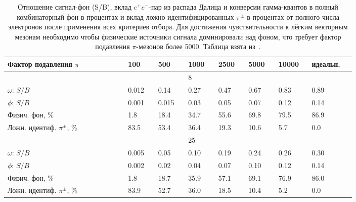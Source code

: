 \begin{table}[H]
\caption{Отношение сигнал-фон (S/B), вклад $e^{+}e^{-}$-пар из распада Далица и конверсии гамма-квантов в полный комбинаторный фон в процентах и вклад ложно идентифицированных $\pi^{\pm}$ в процентах от полного числа электронов после применения всех критериев отбора. Для достижения чувствительности к лёгким векторным мезонам необходимо чтобы физические источники сигнала доминировали над фоном, что требует фактор подавления $\pi$-мезонов более 5000. Таблица взята из~\cite{TDR_RICH}.}
\label{tabl:RICHchar}



\begin{tabular}{ | p{0.28\linewidth} p{0.07\linewidth} p{0.07\linewidth} p{0.07\linewidth} p{0.07\linewidth} p{0.07\linewidth} p{0.07\linewidth} p{0.1\linewidth} | }

\hline
Фактор подавления $\pi$ & 100 & 500 & 1000 & 2500 & 5000 & 10000 & идеальн. \\
\hline
\hline

& & & 8~\GeVperNucl{} & & & & \\
\hline
$\omega$: $S/B$ & 0.012 & 0.14 & 0.27 & 0.47 & 0.67 & 0.83 & 0.89 \\
\hline
$\phi$: $S/B$ & 0.001 & 0.015 & 0.03 & 0.05 & 0.07 & 0.12 & 0.14 \\
\hline
Физич. фон, \% & 1.8 & 18.4 & 34.7 & 55.6 & 69.8 & 79.5 & 86.9 \\
\hline
Ложн. идентиф. $\pi^{\pm}$, \% & 83.5 & 53.4 & 36.4 & 19.3 & 10.6 & 5.7 & 0.0 \\
\hline
\hline

& & & 25~\GeVperNucl{} & & & & \\
\hline
$\omega$: $S/B$ & 0.005 & 0.05 & 0.10 & 0.19 & 0.24 & 0.26 & 0.30 \\
\hline
$\phi$: $S/B$ & 0.002 & 0.02 & 0.04 & 0.07 & 0.10 & 0.12 & 0.14 \\
\hline
Физич. фон, \% & 1.8 & 18.7 & 35.9 & 57.1 & 69.1 & 76.9 & 86.0 \\
\hline
Ложн. идентиф. $\pi^{\pm}$, \% & 83.9 & 52.7 & 36.0 & 18.5 & 10.4 & 5.2 & 0.0 \\
\hline

\end{tabular}

\end{table}
